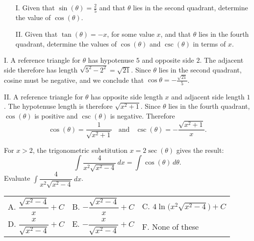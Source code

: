 \documentclass[noauthor]{ximera}
\begin{document}
\begin{problem}
\begin{enumerate}
\item[I.] Given that $\sin( \theta) = \frac{2}{5}$ and that $\theta$ lies in the second quadrant, determine the value of $\cos(\theta)$.
\item[II.] Given that $\tan (\theta) = -  x$, for some value $x$, and that $\theta$ lies in the fourth quadrant, determine the values of $\cos(\theta)$ and $\csc(\theta)$ in terms of $x$.
\end{enumerate}
\end{problem}

\begin{freeResponse}
I. A reference triangle for $\theta$ has hypotenuse $5$ and opposite side $2$. The adjacent side therefore has length $\sqrt{5^2-2^2} = \sqrt{21}$. Since $\theta$ lies in the second quadrant, cosine must be negative, and we conclude that $\cos\theta = -\frac{\sqrt{21}}{5}$.

II. A reference triangle for $\theta$ has opposite side length $x$ and adjacent side length $1$. The hypotenuse length is therefore $\sqrt{x^2+1}$. Since $\theta$ lies in the fourth quadrant, $\cos(\theta)$ is positive and $\csc(\theta)$ is negative. Therefore
$$
\cos(\theta) = \frac{1}{\sqrt{x^2+1}} \;\; \mbox{ and } \;\; \csc(\theta) = -\frac{\sqrt{x^2+1}}{x}.
$$
\end{freeResponse}

\begin{problem}
For $x>2$, the trigonometric substitution $x = 2 \sec(\theta)$ gives the result: $$\int \dfrac{4}{x^2\sqrt{x^2-4}} \, dx = \int  \cos(\theta) \, d \theta.$$
Evaluate $\displaystyle \int \dfrac{4}{x^2\sqrt{x^2-4}} \, dx$.

\vspace{2mm}
\begin{tabular}{lll}
A.  $\dfrac{\sqrt{x^2-4}}{x}+C$    \hspace{8mm} & B. $-\dfrac{\sqrt{x^2-4}}{x}+C$   \hspace{8mm} & C.  $4 \ln\bigg(x^2\sqrt{x^2-4}\bigg) +C$  \\[3ex]
D. $\dfrac{x}{\sqrt{x^2-4}}+C$   \hspace{8mm} & E.  $-\dfrac{x}{\sqrt{x^2-4}}+C$ \hspace{8mm} & F. None of these\\  [2 ex] 
\end{tabular}
\end{problem}
\end{document}
